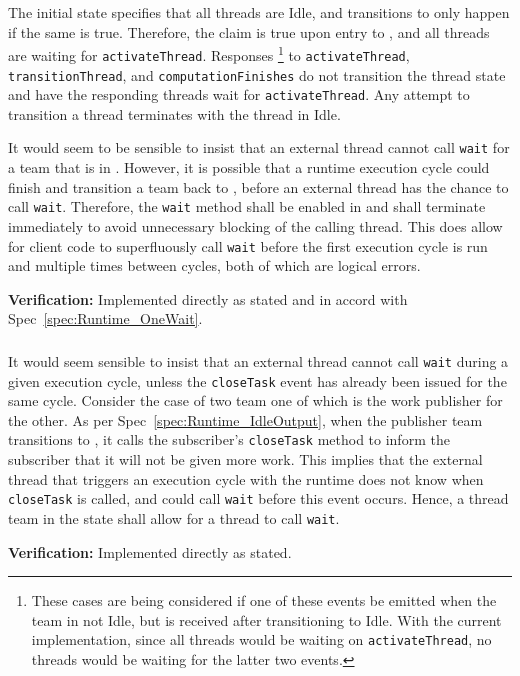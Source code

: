 \documentclass{article}
\begin{document}
The initial state specifies that all threads are Idle, and transitions to
{\TeamIdle} only happen if the same is true.  Therefore, the claim is true upon
entry to {\TeamIdle}, and all threads are waiting for \texttt{activateThread}.
Responses
\footnote{These cases are being considered if one of these
events be emitted when the team in not Idle, but is received after transitioning
to Idle.  With the current implementation, since all threads would be waiting on
\texttt{activateThread}, no threads would be waiting for the latter two events.}
to \texttt{activateThread}, \texttt{transitionThread}, and
\texttt{computationFinishes} do not transition the thread state and have the
responding threads wait for \texttt{activateThread}.  Any attempt to
transition a thread terminates with the thread in Idle.

\begin{spec}
It would seem to be sensible to insist that an external thread cannot call
\texttt{wait} for a team that is in \TeamIdle.  However, it is possible that a
runtime execution cycle could finish and transition a team back to {\TeamIdle},
before an external thread has the chance to call \texttt{wait}.  Therefore, the
\texttt{wait} method shall be enabled in {\TeamIdle} and shall terminate immediately to avoid
unnecessary blocking of the calling thread.  This does allow for
client code to superfluously call \texttt{wait} before the first execution cycle
is run and multiple times between cycles, both of which are logical errors.
\end{spec}
\textbf{Verification:}\hspace{0.125in}  Implemented directly as stated and in
accord with Spec~\ref{spec:Runtime_OneWait}.

\subsubsection{\TeamRunningOpen}
\begin{spec}
It would seem sensible to insist that an external thread cannot call
\texttt{wait} during a given execution cycle, unless the \texttt{closeTask} event
has already been issued for the same cycle.  Consider the case of two
team one of which is the work publisher for the other.  As per
Spec~\ref{spec:Runtime_IdleOutput}, when the publisher team transitions to
{\TeamIdle}, it calls the subscriber's \texttt{closeTask} method to inform the
subscriber that it will not be given more work.  This implies that the external
thread that triggers an execution cycle with the runtime does not know when
\texttt{closeTask} is called, and could call \texttt{wait} before this
event occurs.  Hence, a thread team in the state {\TeamRunningOpen} shall allow
for a thread to call \texttt{wait}.
\end{spec}
\textbf{Verification:}\hspace{0.125in}  Implemented directly as stated.
\end{document}
